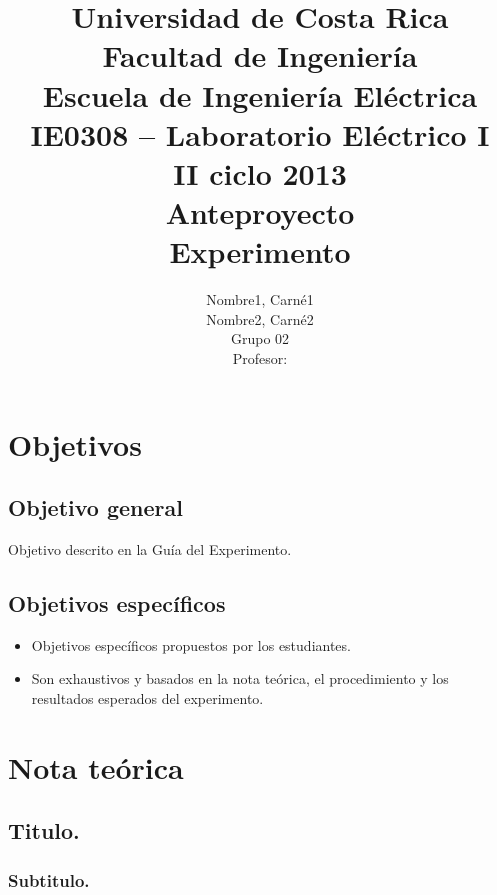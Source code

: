 \documentclass[12pt,letterpaper]{article}     %
\author{Nombre1, Carné1 \\ Nombre2, Carné2 \\ {\small Grupo 02}\\ Profesor:  \vspace*{3.0in}}
\title{Universidad de Costa Rica\\{\small Facultad de Ingeniería\\Escuela de Ingeniería Eléctrica\\IE0308 – Laboratorio Eléctrico I\\II ciclo 2013\\\vspace*{0.55in} Anteproyecto}\\ Experimento \vspace*{1.35in}}
\begin{document}


\maketitle							%


\tableofcontents
\newpage
\listoffigures
\listoftables

\newpage

\section{Objetivos}

\subsection{Objetivo general}

Objetivo descrito en la Guía del Experimento.


\subsection{Objetivos específicos}

\begin{itemize}
\item Objetivos específicos propuestos por los estudiantes.
\item Son exhaustivos y basados en la nota teórica, el procedimiento y los resultados esperados del experimento.
\end{itemize}

\newpage
\section{Nota teórica}

\setcounter{secnumdepth}{4}



\subsection{Titulo.}

\subsubsection{Subtitulo.}
\end{document}
